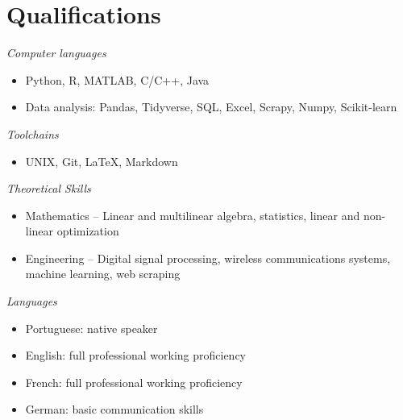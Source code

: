 \section{Qualifications} 

{\sl Computer languages} 
\begin{itemize}
	\item[] Python, R, MATLAB, C/C++, Java
	\item[] Data analysis: Pandas, Tidyverse, SQL, Excel, Scrapy, Numpy, Scikit-learn
\end{itemize}

{\sl Toolchains}
\begin{itemize}
	\item[] UNIX, Git, \LaTeX, Markdown
\end{itemize}

{\sl Theoretical Skills}
\begin{itemize}
	\item[] Mathematics --  Linear and multilinear algebra, statistics, linear and non-linear optimization
	\item[] Engineering -- Digital signal processing, wireless communications systems, machine learning, web scraping
\end{itemize}

\vspace{0.5cm}

{\sl Languages}
\begin{itemize}
	\item[] Portuguese: native speaker
	\item[] English: full professional working proficiency
	\item[] French: full professional working proficiency
	\item[] German: basic communication skills
\end{itemize}